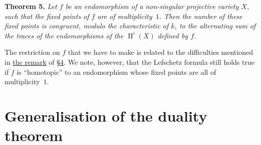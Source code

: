 \documentclass{article}
\newenvironment{itenv}[1]
  {\phantomsection\par\medskip\noindent\textbf{#1.}\itshape}
  {\medskip}
\DeclareMathOperator{\HH}{H}
\begin{document}
\begin{itenv}{Theorem 5}
\label{theorem5}
  Let $f$ be an endomorphism of a non-singular projective variety $X$, such that the fixed points of $f$ are of multiplicity~$1$.
  Then the number of these fixed points is congruent, modulo the characteristic of $k$, to the alternating sum of the traces of the endomorphisms of the $\HH^i(X)$ defined by $f$.
\end{itenv}

The restriction on $f$ that we have to make is related to the difficulties mentioned in \hyperref[section4remark]{the remark} of \hyperref[section4]{\S4}.
We note, however, that the Lefschetz formula still holds true if $f$ is ``homotopic'' to an endomorphism whose fixed points are all of multiplicity~$1$.


\section{Generalisation of the duality theorem}
\label{section8}
\end{document}
